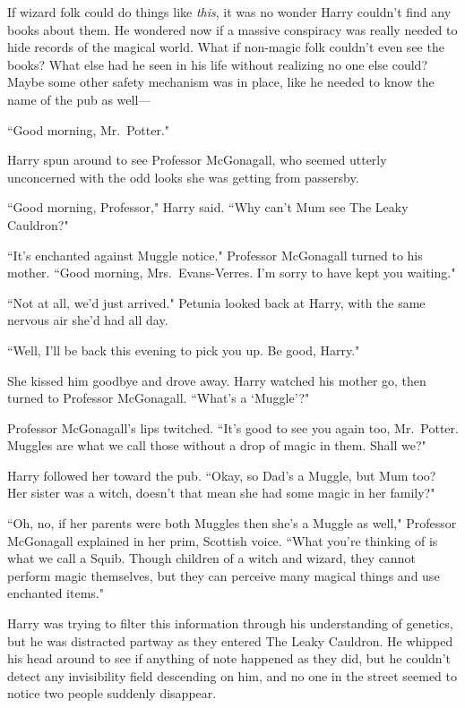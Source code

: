 If wizard folk could do things like \emph{this}, it was no wonder Harry couldn't find any books about them. He wondered now if a massive conspiracy was really needed to hide records of the magical world. What if non-magic folk couldn't even see the books? What else had he seen in his life without realizing no one else could? Maybe some other safety mechanism was in place, like he needed to know the name of the pub as well---

``Good morning, Mr.~Potter."

Harry spun around to see Professor McGonagall, who seemed utterly unconcerned with the odd looks she was getting from passersby.

``Good morning, Professor," Harry said. ``Why can't Mum see The Leaky Cauldron?"

``It's enchanted against Muggle notice." Professor McGonagall turned to his mother. ``Good morning, Mrs.~Evans-Verres. I'm sorry to have kept you waiting."

``Not at all, we'd just arrived." Petunia looked back at Harry, with the same nervous air she'd had all day.

``Well, I'll be back this evening to pick you up. Be good, Harry."

She kissed him goodbye and drove away. Harry watched his mother go, then turned to Professor McGonagall. ``What's a `Muggle'?"

Professor McGonagall's lips twitched. ``It's good to see you again too, Mr.~Potter. Muggles are what we call those without a drop of magic in them. Shall we?"

Harry followed her toward the pub. ``Okay, so Dad's a Muggle, but Mum too? Her sister was a witch, doesn't that mean she had some magic in her family?"

``Oh, no, if her parents were both Muggles then she's a Muggle as well," Professor McGonagall explained in her prim, Scottish voice. ``What you're thinking of is what we call a Squib. Though children of a witch and wizard, they cannot perform magic themselves, but they can perceive many magical things and use enchanted items."

Harry was trying to filter this information through his understanding of genetics, but he was distracted partway as they entered The Leaky Cauldron. He whipped his head around to see if anything of note happened as they did, but he couldn't detect any invisibility field descending on him, and no one in the street seemed to notice two people suddenly disappear.

